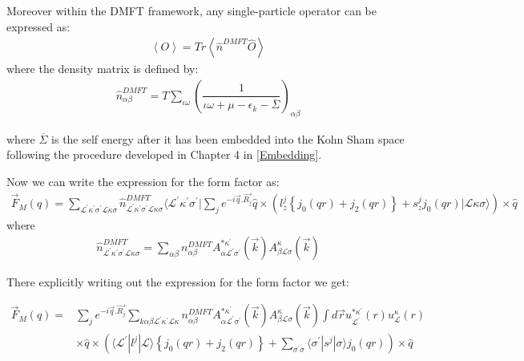 \documentclass[10pt]{ruthesis}
\begin{document}
{ Moreover within the DMFT framework, any single-particle operator can be expressed as:
 \begin{align}
 \left\langle O \right\rangle = Tr \left\langle \hat{n}^{DMFT} \hat{O} \right\rangle
 \end{align}
where the density matrix is defined by:
\begin{align}
\hat{n}^{DMFT}_{\alpha \beta}=T \sum_{\iota \omega} \left( \dfrac{1}{\iota \omega +\mu -\epsilon_{k}-\overline{\Sigma}} \right)_{\alpha \beta}
\end{align}

where $\overline{\Sigma}$ is the self energy after it has been embedded into the Kohn Sham space following the procedure developed in Chapter 4 in \ref{Embedding}.

Now we can write the expression for the form factor as:
\begin{align}
\vec{F}_{M}(q)=\sum_{\mathcal{L}^{'}\kappa^{'}\sigma^{'} \mathcal{L}\kappa\sigma} \hat{n}^{DMFT}_{\mathcal{L}^{'}\kappa^{'}\sigma^{'} \mathcal{L}\kappa\sigma} \langle \mathcal{L}^{'}\kappa^{'}\sigma^{'} | \sum_{j} e^{-i\vec{q}.\vec{R_j}} \hat{q} \times\left( l^{j}_{z} \left \lbrace j_{0}(qr) +j_{2}(qr) \right \rbrace + s^{j}_{z} j_0(qr) |\mathcal{L}\kappa\sigma \rangle  \right) \times \hat{q}
\end{align}
where 
\begin{align}
\hat{n}^{DMFT}_{\mathcal{L}^{'}\kappa^{'}\sigma^{'} \mathcal{L}\kappa\sigma}=\sum_{\alpha \beta} n^{DMFT}_{\alpha \beta} A^{* \kappa^{'}}_{\alpha \mathcal{L}^{'} \sigma^{'}}(\vec{k}) A^{ \kappa}_{\beta \mathcal{L}\sigma}(\vec{k})
\end{align}

There explicitly writing out the expression for the form factor we get:

\begin{equation} \label{F_M_final}
\begin{split}
\vec{F}_{M}(q)= & \sum_{j} e^{-i\vec{q}.\vec{R_j}}   \sum_{k\alpha \beta \mathcal{L}^{'} \kappa^{'} \mathcal{L}\kappa} n^{DMFT}_{\alpha \beta} A^{* \kappa^{'}}_{\alpha \mathcal{L}^{'} \sigma^{'}}(\vec{k}) A^{ \kappa}_{\beta \mathcal{L}\sigma}(\vec{k}) \int d \vec{r}u_{\mathcal{L^{'}}}^{*\kappa^{'} }(r)u_{\mathcal{L}}^{\kappa}(r) \\
& \times \hat{q} \times\left( \langle\mathcal{L^{'}}|l^j|\mathcal{L}\rangle  \left\lbrace  j_{0}(qr) +j_{2}(qr) \right \rbrace +   \sum_{\sigma^{'} \sigma} \langle \sigma^{'} |s^j|\sigma \rangle
 j_0(qr) \right) \times \hat{q} 
\end{split}
\end{equation}
 

}
\end{document}
